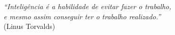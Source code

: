 \begin{epigrafe}
    \vspace*{\fill}
    \vspace*{\fill}
	\begin{flushright}
		\textit{``Inteligência é a habilidade de evitar fazer o trabalho, \\
		e mesmo assim conseguir ter o trabalho realizado.''} \\
		(Linus Torvalds)
	\end{flushright}
	\vspace*{\fill}
\end{epigrafe}


